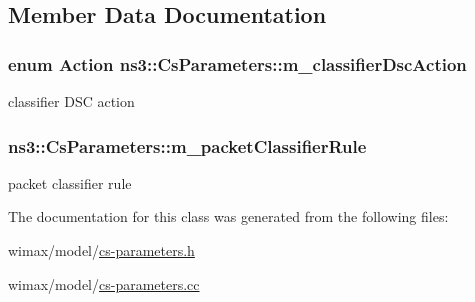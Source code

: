 \subsection{Member Data Documentation}
\subsubsection[{\texorpdfstring{m\+\_\+classifier\+Dsc\+Action}{m_classifierDscAction}}]{\setlength{\rightskip}{0pt plus 5cm}enum {\bf Action} ns3\+::\+Cs\+Parameters\+::m\+\_\+classifier\+Dsc\+Action\hspace{0.3cm}{\ttfamily [private]}}\hypertarget{classns3_1_1CsParameters_af0db36066ced018b75b117890cdccd27}{}\label{classns3_1_1CsParameters_af0db36066ced018b75b117890cdccd27}


classifier D\+SC action 

\subsubsection[{\texorpdfstring{m\+\_\+packet\+Classifier\+Rule}{m_packetClassifierRule}}]{ ns3\+::\+Cs\+Parameters\+::m\+\_\+packet\+Classifier\+Rule\hspace{0.3cm}{\ttfamily [private]}}\hypertarget{classns3_1_1CsParameters_ac1298c7224ec5cd77120272111c10bb2}{}\label{classns3_1_1CsParameters_ac1298c7224ec5cd77120272111c10bb2}


packet classifier rule 



The documentation for this class was generated from the following files\+:\begin{DoxyCompactItemize}
\item 
wimax/model/\hyperlink{cs-parameters_8h}{cs-\/parameters.\+h}\item 
wimax/model/\hyperlink{cs-parameters_8cc}{cs-\/parameters.\+cc}\end{DoxyCompactItemize}
